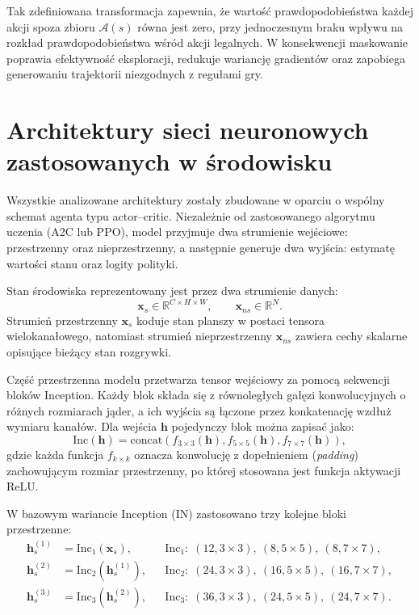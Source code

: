 Tak zdefiniowana transformacja zapewnia, że wartość prawdopodobieństwa każdej akcji spoza zbioru \( \mathcal{A}(s) \) równa jest zero, przy jednoczesnym braku wpływu na rozkład prawdopodobieństwa wśród akcji legalnych. W konsekwencji maskowanie poprawia efektywność eksploracji, redukuje wariancję gradientów oraz zapobiega generowaniu trajektorii niezgodnych z regułami gry.


\section{Architektury sieci neuronowych zastosowanych w środowisku}

Wszystkie analizowane architektury zostały zbudowane w oparciu o wspólny schemat
agenta typu actor--critic. Niezależnie od zastosowanego algorytmu uczenia
(A2C lub PPO), model przyjmuje dwa strumienie wejściowe: przestrzenny oraz
nieprzestrzenny, a następnie generuje dwa wyjścia: estymatę wartości stanu
oraz logity polityki.

Stan środowiska reprezentowany jest przez dwa strumienie danych:
\[
\mathbf{x}_s \in \mathbb{R}^{C \times H \times W},
\qquad
\mathbf{x}_{ns} \in \mathbb{R}^{N}.
\]
Strumień przestrzenny \( \mathbf{x}_s \) koduje stan planszy w postaci tensora
wielokanałowego, natomiast strumień nieprzestrzenny \( \mathbf{x}_{ns} \)
zawiera cechy skalarne opisujące bieżący stan rozgrywki.

Część przestrzenna modelu przetwarza tensor wejściowy za pomocą sekwencji bloków
Inception. Każdy blok składa się z równoległych gałęzi konwolucyjnych o różnych
rozmiarach jąder, a ich wyjścia są łączone przez konkatenację wzdłuż wymiaru kanałów.
Dla wejścia \( \mathbf{h} \) pojedynczy blok można zapisać jako:
\begin{equation}
	\mathrm{Inc}(\mathbf{h}) =
	\mathrm{concat}\!\left(
	f_{3\times3}(\mathbf{h}),
	f_{5\times5}(\mathbf{h}),
	f_{7\times7}(\mathbf{h})
	\right),
\end{equation}
gdzie każda funkcja \(f_{k\times k}\) oznacza konwolucję z dopełnieniem
(\textit{padding}) zachowującym rozmiar przestrzenny, po której stosowana jest
funkcja aktywacji ReLU.

W bazowym wariancie Inception (IN) zastosowano trzy kolejne bloki przestrzenne:
\begin{align}
	\mathbf{h}_s^{(1)} &= \mathrm{Inc}_1(\mathbf{x}_s),
	&& \mathrm{Inc}_1:\; (12,3\times3),\ (8,5\times5),\ (8,7\times7),\\
	\mathbf{h}_s^{(2)} &= \mathrm{Inc}_2(\mathbf{h}_s^{(1)}),
	&& \mathrm{Inc}_2:\; (24,3\times3),\ (16,5\times5),\ (16,7\times7),\\
	\mathbf{h}_s^{(3)} &= \mathrm{Inc}_3(\mathbf{h}_s^{(2)}),
	&& \mathrm{Inc}_3:\; (36,3\times3),\ (24,5\times5),\ (24,7\times7).
\end{align}

